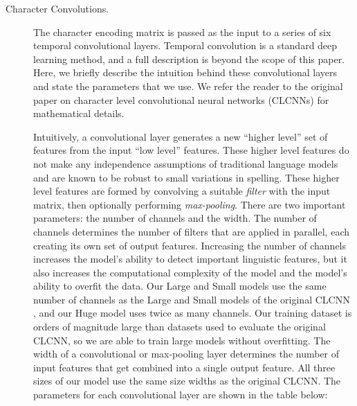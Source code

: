 \documentclass[sigconf,10pt]{acmart}
\newcommand{\defn}[1]{\textit{#1}}
\begin{document}
\begin{description}

\item[Character Convolutions.]
    The character encoding matrix is passed as the input to a series of six temporal convolutional layers.
    Temporal convolution is a standard deep learning method,
    and a full description is beyond the scope of this paper.
    Here, we briefly describe the intuition behind these convolutional layers and state the parameters that we use.
    We refer the reader to %
    the original paper on character level convolutional neural networks (CLCNNs) \citep{zhang2015character} for mathematical details.

    Intuitively, a convolutional layer generates a new ``higher level'' set of features from the input ``low level'' features.
    These higher level features do not make any independence assumptions of traditional language models and are known to be robust to small variations in spelling.
    These higher level features are formed by convolving a suitable \defn{filter} with the input matrix, 
    then optionally performing \defn{max-pooling}.
    There are two important parameters: the number of channels and the width.
    The number of channels determines the number of filters that are applied in parallel,
    each creating its own set of output features.
    Increasing the number of channels increases the model's ability to detect important linguistic features,
    but it also increases the computational complexity of the model and the model's ability to overfit the data.
    Our Large and Small models use the same number of channels as the Large and Small models of the original CLCNN \citep{zhang2015character},
    and our Huge model uses twice as many channels.
    Our training dataset is orders of magnitude large than datasets used to evaluate the original CLCNN,
    so we are able to train large models without overfitting.
    The width of a convolutional or max-pooling layer determines the number of input features that get combined into a single output feature.
    All three sizes of our model use the same size widths as the original CLCNN.
    The parameters for each convolutional layer are shown in the table below:


\end{description}
\end{document}
